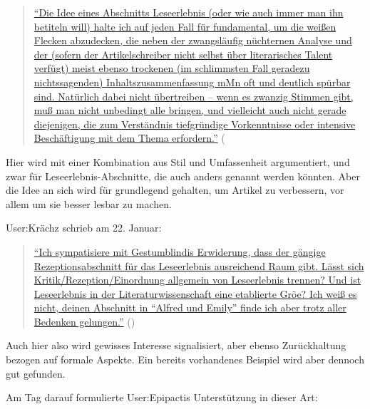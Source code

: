 \documentclass[fontsize=12pt]{scrartcl}
\begin{document}
\singlespacing
\begin{quote}
\href{https://de.wikipedia.org/w/index.php?title=Benutzer_Diskussion:Grillenwaage\&diff=next\&oldid=138032479}{"`Die Idee eines Abschnitts \flq Leseerlebnis\frq \,\,(oder wie auch immer man ihn betiteln will) halte ich auf jeden Fall f\"ur fundamental, um die \flq wei{\ss}en Flecken\frq \,\,abzudecken, die neben der zwangsl\"aufig n\"uchternen Ana\-lyse und der (sofern der Artikelschreiber nicht \mbox{selbst} \"uber li\-te\-ra\-risches Ta\-lent ver\-f\"ugt) meist ebenso trockenen (im schlimmsten Fall geradezu nichts\-sa\-gen\-den) Inhaltszusammenfassung mMn oft und deutlich sp\"urbar sind. Na\-t\"ur\-lich dabei nicht \"ubertreiben -- wenn es zwanzig Stimmen gibt, mu{\ss} man nicht un\-be\-dingt alle bringen, und vielleicht auch nicht gerade diejenigen, die zum Verst\"andnis tiefgr\"undige Vorkenntnisse oder intensive Be\-sch\"af\-ti\-gung mit dem Thema erfordern."'} (\cite{UserEpipactis2015c}
\end{quote}
\onehalfspacing

Hier wird mit einer Kombination aus Stil und Umfassenheit argumentiert, und zwar f\"ur Leseerlebnis-Abschnitte, die auch anders genannt werden k\"onnten. Aber die Idee an sich wird f\"ur grundlegend gehalten, um Artikel zu verbessern, vor allem um sie besser lesbar zu machen. 

User:Kr\"achz schrieb am 22. Januar: 

\singlespacing
\begin{quote}
\href{https://de.wikipedia.org/w/index.php?title=Benutzer_Diskussion:Grillenwaage\&diff=next\&oldid=138039032}{"`Ich sympatisiere mit Ges\-tum\-blin\-dis Erwiderung, dass der g\"angige \flq Re\-zep\-tions\-ab\-schnitt\frq \,\,f\"ur das \flq Leseerlebnis\frq \,\,ausreichend Raum gibt. L\"asst sich Kritik/Rezeption/Einordnung allgemein von Leseerlebnis trennen? Und ist \flq Leseerlebnis\frq \,\,in der Li\-te\-ra\-tur\-wissenschaft eine etablierte Gr\"o\-{\ss}e? Ich wei{\ss} es nicht, deinen Abschnitt in "`Alfred und Emily"' finde ich aber trotz aller Bedenken gelungen."'} (\cite{UserKrachz2015}) 
\end{quote}
\onehalfspacing 

Auch \mbox{hier} also wird gewisses Interesse sig\-na\-li\-siert, aber ebenso Zur\"uckhaltung bezogen auf formale Aspekte. Ein bereits vorhandenes Beispiel wird aber dennoch gut gefunden. 

Am Tag darauf formulierte \mbox{User}:Epipactis Unterst\"utzung in dieser Art: 
\end{document}
